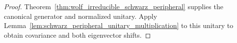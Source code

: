 \begin{proof}\leanok
    Theorem~\ref{thm:wolf_irreducible_schwarz_peripheral} supplies the
    canonical generator and normalized unitary. Apply
    Lemma~\ref{lem:schwarz_peripheral_unitary_multiplication} to this
    unitary to obtain covariance and both eigenvector shifts.
\end{proof}
